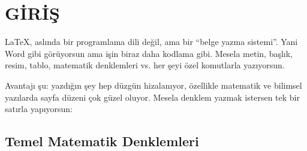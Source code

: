 \section{GİRİŞ}
LaTeX, aslında bir programlama dili değil, ama bir “belge yazma sistemi”. 
Yani Word gibi görüyorsun ama işin biraz daha kodlama gibi. 
Mesela metin, başlık, resim, tablo, matematik denklemleri vs. 
her şeyi özel komutlarla yazıyorsun.

Avantajı şu: yazdığın şey hep düzgün hizalanıyor, 
özellikle matematik ve bilimsel yazılarda sayfa düzeni çok güzel oluyor. 
Mesela denklem yazmak istersen tek bir satırla yapıyorsun:

\subsection{Temel Matematik Denklemleri}

